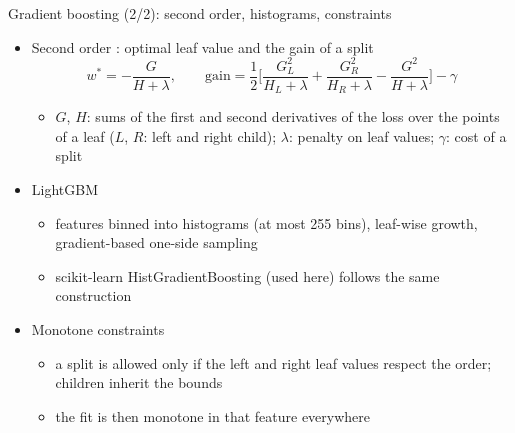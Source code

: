 \begin{frame}{Gradient boosting (2/2): second order, histograms, constraints}
\itemsize{\small}
\begin{itemize}
    \item Second order : optimal leaf value and the gain of a split
    \[ w^* = -\frac{G}{H + \lambda}, \qquad \mathrm{gain} = \frac12\Big[\frac{G_L^2}{H_L + \lambda} + \frac{G_R^2}{H_R + \lambda} - \frac{G^2}{H + \lambda}\Big] - \gamma \]
    \begin{itemize}
        \item $G$, $H$: sums of the first and second derivatives of the loss over the points of a leaf ($L$, $R$: left and right child); $\lambda$: penalty on leaf values; $\gamma$: cost of a split
    \end{itemize}
    \item LightGBM 
    \begin{itemize}
        \item features binned into histograms (at most 255 bins), leaf-wise growth, gradient-based one-side sampling
        \item scikit-learn HistGradientBoosting (used here) follows the same construction
    \end{itemize}
    \item Monotone constraints
    \begin{itemize}
        \item a split is allowed only if the left and right leaf values respect the order; children inherit the bounds
        \item the fit is then monotone in that feature everywhere
    \end{itemize}
\end{itemize}
\end{frame}

